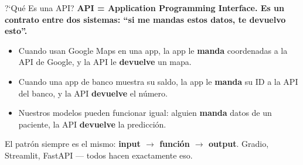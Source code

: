 \documentclass[aspectratio=169, 11pt]{beamer}
\begin{document}
\begin{frame}{?`Qu\'e Es una API?}
  \vspace{-4pt}
  {\footnotesize\color{arcaDark}\bfseries
    API = Application Programming Interface. Es un \textbf{contrato}
    entre dos sistemas: ``si me mandas estos datos, te devuelvo esto''.}

  \vspace{6pt}
  {\footnotesize
  \begin{itemize}\setlength{\itemsep}{5pt}
    \item[{\color{arcaRed}\scriptsize\faArrowRight}]
      Cuando usan Google Maps en una app, la app le \textbf{manda}
      coordenadas a la API de Google, y la API le \textbf{devuelve} un mapa.
    \item[{\color{arcaRed}\scriptsize\faArrowRight}]
      Cuando una app de banco muestra su saldo, la app le
      \textbf{manda} su ID a la API del banco, y la API
      \textbf{devuelve} el n\'umero.
    \item[{\color{codeGreen}\scriptsize\faArrowRight}]
      Nuestros modelos pueden funcionar igual: alguien \textbf{manda}
      datos de un paciente, la API \textbf{devuelve} la predicci\'on.
  \end{itemize}
  }

  \vspace{6pt}
  {\scriptsize\color{textMuted}
    \faLightbulb\hspace{4pt} El patr\'on siempre es el mismo:
    \textbf{input $\to$ funci\'on $\to$ output}. Gradio, Streamlit,
    FastAPI --- todos hacen exactamente eso.}
\end{frame}
\end{document}
